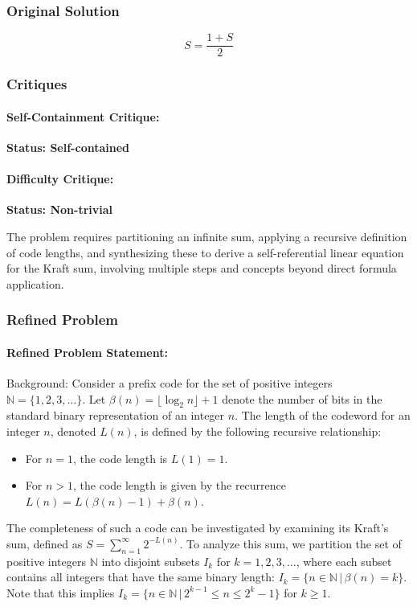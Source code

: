 \documentclass[10pt]{article}
\begin{document}
\subsubsection*{Original Solution}
\[ S = \frac{1+S}{2} \]

\subsubsection*{Critiques}
\paragraph*{Self-Containment Critique:}
\textcolor{pass}{\textbf{Status: Self-contained}}




\paragraph*{Difficulty Critique:}
\textcolor{pass}{\textbf{Status: Non-trivial}}

The problem requires partitioning an infinite sum, applying a recursive definition of code lengths, and synthesizing these to derive a self-referential linear equation for the Kraft sum, involving multiple steps and concepts beyond direct formula application.


\subsubsection*{Refined Problem}
\paragraph*{Refined Problem Statement:}
Background:
Consider a prefix code for the set of positive integers $\mathbb{N} = \{1, 2, 3, \ldots\}$. Let $\beta(n) = \lfloor \log_2 n \rfloor + 1$ denote the number of bits in the standard binary representation of an integer $n$. The length of the codeword for an integer $n$, denoted $L(n)$, is defined by the following recursive relationship:
\begin{itemize}
    \item For $n=1$, the code length is $L(1) = 1$.
    \item For $n > 1$, the code length is given by the recurrence $L(n) = L(\beta(n)-1) + \beta(n)$.
\end{itemize}
The completeness of such a code can be investigated by examining its Kraft's sum, defined as $S = \sum_{n=1}^{\infty} 2^{-L(n)}$. To analyze this sum, we partition the set of positive integers $\mathbb{N}$ into disjoint subsets $I_k$ for $k=1, 2, 3, \ldots$, where each subset contains all integers that have the same binary length: $I_k = \{ n \in \mathbb{N} \,|\, \beta(n) = k \}$. Note that this implies $I_k = \{ n \in \mathbb{N} \,|\, 2^{k-1} \leq n \leq 2^k - 1\}$ for $k \geq 1$.
\end{document}
